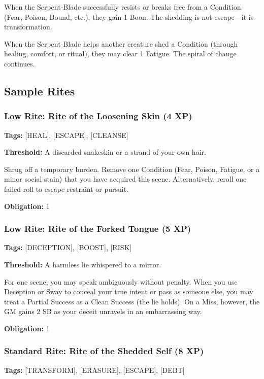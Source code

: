 When the Serpent-Blade successfully resists or breaks free from a Condition (Fear, Poison, Bound, etc.), they gain 1 Boon. The shedding is not escape—it is transformation.

When the Serpent-Blade helps another creature shed a Condition (through healing, comfort, or ritual), they may clear 1 Fatigue. The spiral of change continues.

\subsection{Sample Rites}

\subsubsection{Low Rite: Rite of the Loosening Skin (4 XP)}

\textbf{Tags:} [HEAL], [ESCAPE], [CLEANSE]

\textbf{Threshold:} A discarded snakeskin or a strand of your own hair.

Shrug off a temporary burden. Remove one Condition (Fear, Poison, Fatigue, or a minor social stain) that you have acquired this scene. Alternatively, reroll one failed roll to escape restraint or pursuit.

\textbf{Obligation:} 1

\subsubsection{Low Rite: Rite of the Forked Tongue (5 XP)}

\textbf{Tags:} [DECEPTION], [BOOST], [RISK]

\textbf{Threshold:} A harmless lie whispered to a mirror.

For one scene, you may speak ambiguously without penalty. When you use Deception or Sway to conceal your true intent or pass as someone else, you may treat a Partial Success as a Clean Success (the lie holds). On a Miss, however, the GM gains 2 SB as your deceit unravels in an embarrassing way.

\textbf{Obligation:} 1

\subsubsection{Standard Rite: Rite of the Shedded Self (8 XP)}

\textbf{Tags:} [TRANSFORM], [ERASURE], [ESCAPE], [DEBT]

